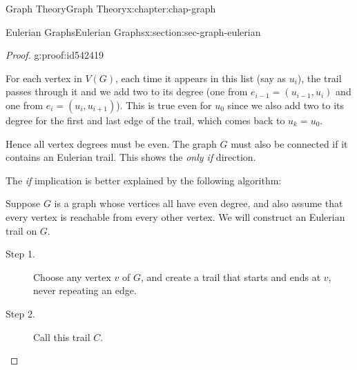\documentclass[oneside,10pt,]{book}
\numberwithin{equation}{section}
\begin{document}
\begin{chapterptx}{Graph Theory}{}{Graph Theory}{}{}{x:chapter:chap-graph}
\begin{sectionptx}{Eulerian Graphs}{}{Eulerian Graphs}{}{}{x:section:sec-graph-eulerian}
\begin{proof}{}{g:proof:id542419}
\begin{sidebyside}{1}{0.275}{0.275}{0}
\begin{sbspanel}{0.45}
{
}%
\end{sbspanel}%
\end{sidebyside}%
\par
For each vertex in \(V(G)\), each time it appears in this list (say as \(u_i\)), the trail passes through it and we add two to its degree (one from \(e_{i-1} = (u_{i-1},u_i)\) and one from \(e_i = (u_i,u_{i+1})\)). This is true even for \(u_0\) since we also add two to its degree for the first and last edge of the trail, which comes back to \(u_k = u_0\).%
\par
Hence all vertex degrees must be even. The graph \(G\) must also be connected if it contains an Eulerian trail. This shows the \emph{only if} direction.%
\par
The \emph{if} implication is better explained by the following algorithm:%
\par
Suppose \(G\) is a graph whose vertices all have even degree, and also assume that every vertex is reachable from every other vertex. We will construct an Eulerian trail on \(G\).%
\par
%
\begin{description}
\item[{Step 1.}]Choose any vertex \(v\) of \(G\), and create a trail that starts and ends at \(v\), never repeating an edge.%
\item[{Step 2.}]Call this trail \(C\).%

\end{description}
\end{proof}
\end{sectionptx}
\end{chapterptx}
\end{document}
